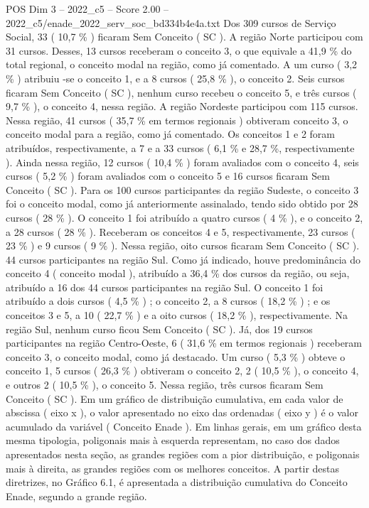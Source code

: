 \begin{textsample}{POS Dim 3 – 2022\_c5 – Score 2.00 – 2022\_c5/enade\_2022\_serv\_soc\_bd334b4e4a.txt}
Dos 309 cursos de Serviço Social, 33 ( 10,7 \% ) ficaram Sem Conceito ( SC ).
A região Norte participou com 31 cursos.
Desses, 13 cursos receberam o conceito 3, o que equivale a 41,9 \% do total regional, o conceito modal na região, como já comentado.
A um curso ( 3,2 \% ) atribuiu -se o conceito 1, e a 8 cursos ( 25,8 \% ), o conceito 2.
Seis cursos ficaram Sem Conceito ( SC ), nenhum curso recebeu o conceito 5, e três cursos ( 9,7 \% ), o conceito 4, nessa região.
A região Nordeste participou com 115 cursos.
Nessa região, 41 cursos ( 35,7 \% em termos regionais ) obtiveram conceito 3, o conceito modal para a região, como já comentado.
Os conceitos 1 e 2 foram atribuídos, respectivamente, a 7 e a 33 cursos ( 6,1 \% e 28,7 \%, respectivamente ).
Ainda nessa região, 12 cursos ( 10,4 \% ) foram avaliados com o conceito 4, seis cursos ( 5,2 \% ) foram avaliados com o conceito 5 e 16 cursos ficaram Sem Conceito ( SC ).
Para os 100 cursos participantes da região Sudeste, o conceito 3 foi o conceito modal, como já anteriormente assinalado, tendo sido obtido por 28 cursos ( 28 \% ).
O conceito 1 foi atribuído a quatro cursos ( 4 \% ), e o conceito 2, a 28 cursos ( 28 \% ).
Receberam os conceitos 4 e 5, respectivamente, 23 cursos ( 23 \% ) e 9 cursos ( 9 \% ).
Nessa região, oito cursos ficaram Sem Conceito ( SC ). 44 cursos participantes na região Sul.
Como já indicado, houve predominância do conceito 4 ( conceito modal ), atribuído a 36,4 \% dos cursos da região, ou seja, atribuído a 16 dos 44 cursos participantes na região Sul.
O conceito 1 foi atribuído a dois cursos ( 4,5 \% ) ; o conceito 2, a 8 cursos ( 18,2 \% ) ; e os conceitos 3 e 5, a 10 ( 22,7 \% ) e a oito cursos ( 18,2 \% ), respectivamente.
Na região Sul, nenhum curso ficou Sem Conceito ( SC ).
Já, dos 19 cursos participantes na região Centro-Oeste, 6 ( 31,6 \% em termos regionais ) receberam conceito 3, o conceito modal, como já destacado.
Um curso ( 5,3 \% ) obteve o conceito 1, 5 cursos ( 26,3 \% ) obtiveram o conceito 2, 2 ( 10,5 \% ), o conceito 4, e outros 2 ( 10,5 \% ), o conceito 5.
Nessa região, três cursos ficaram Sem Conceito ( SC ).
Em um gráfico de distribuição cumulativa, em cada valor de abscissa ( eixo x ), o valor apresentado no eixo das ordenadas ( eixo y ) é o valor acumulado da variável ( Conceito Enade ).
Em linhas gerais, em um gráfico desta mesma tipologia, poligonais mais à esquerda representam, no caso dos dados apresentados nesta seção, as grandes regiões com a pior distribuição, e poligonais mais à direita, as grandes regiões com os melhores conceitos.
A partir destas diretrizes, no Gráfico 6.1, é apresentada a distribuição cumulativa do Conceito Enade, segundo a grande região.

\end{textsample}
